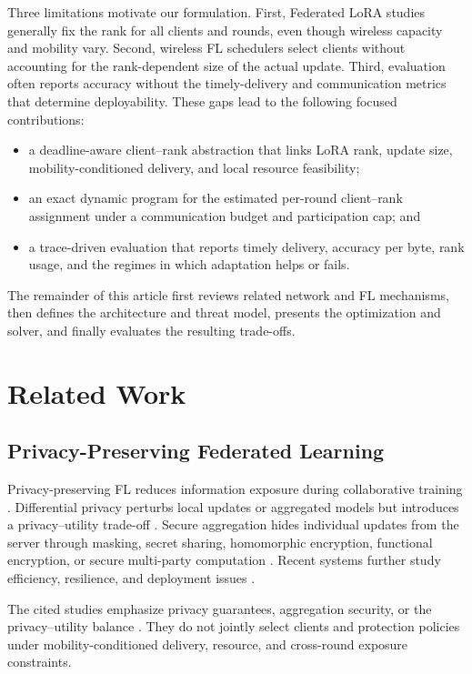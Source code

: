 \documentclass[preprint,12pt]{elsarticle}
\begin{document}
Three limitations motivate our formulation. First, Federated LoRA studies generally fix the rank for all clients and rounds, even though wireless capacity and mobility vary. Second, wireless FL schedulers select clients without accounting for the rank-dependent size of the actual update. Third, evaluation often reports accuracy without the timely-delivery and communication metrics that determine deployability. These gaps lead to the following focused contributions:
\begin{itemize}
    \item a deadline-aware client--rank abstraction that links LoRA rank, update size, mobility-conditioned delivery, and local resource feasibility;
    \item an exact dynamic program for the estimated per-round client--rank assignment under a communication budget and participation cap; and
    \item a trace-driven evaluation that reports timely delivery, accuracy per byte, rank usage, and the regimes in which adaptation helps or fails.
\end{itemize}
The remainder of this article first reviews related network and FL mechanisms, then defines the architecture and threat model, presents the optimization and solver, and finally evaluates the resulting trade-offs.

\section{Related Work}

\subsection{Privacy-Preserving Federated Learning}

Privacy-preserving FL reduces information exposure during collaborative training \cite{zhao2025federation,kairouz2021advances}. Differential privacy perturbs local updates or aggregated models but introduces a privacy--utility trade-off \cite{wei2023pfl_dp,yuan2023amplitude,yuan2023privacyresource}. Secure aggregation hides individual updates from the server through masking, secret sharing, homomorphic encryption, functional encryption, or secure multi-party computation \cite{bonawitz2017secureagg,mansouri2023sok}. Recent systems further study efficiency, resilience, and deployment issues \cite{zheng2023aggregation}.

The cited studies emphasize privacy guarantees, aggregation security, or the privacy--utility balance \cite{wei2023pfl_dp,yuan2023amplitude,zhao2025federation}. They do not jointly select clients and protection policies under mobility-conditioned delivery, resource, and cross-round exposure constraints.
\end{document}
